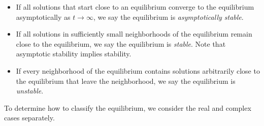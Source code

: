 \begin{itemize}
\item If all solutions that start close to an equilibrium converge
to the equilibrium asymptotically as $t\rightarrow\infty$, we
say the equilibrium is
\emph{asymptotically stable}.
\item If all solutions in sufficiently small neighborhoods
of the equilibrium remain close to the equilibrium, we say
the equilibrium is \emph{stable}.
Note that asymptotic stability implies stability.
\item If every neighborhood of the equilibrium contains solutions
arbitrarily close to the equilibrium that leave the neighborhood, we say the equilibrium is \emph{unstable}. 
\end{itemize}
To determine how to classify the equilibrium, we consider
the real and complex cases separately.

